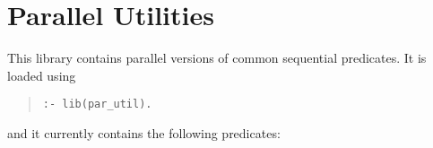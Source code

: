 %
% 
% 
% 
% 
%
%
%

\section{Parallel Utilities}
\label{chapparutil}

This library contains parallel versions of common sequential predicates.
It is loaded using
\begin{quote}
\begin{verbatim}
:- lib(par_util).
\end{verbatim}
\end{quote}
and it currently contains the following predicates:

